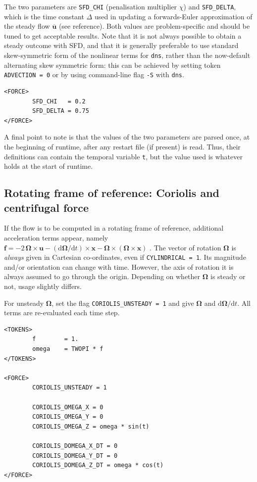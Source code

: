 \documentclass[11pt]{report}
\newcommand\cd{\mathrm{d}} \newcommand\cD{\mathrm{D}}
\begin{document}
The two parameters are \verb|SFD_CHI| (\ie penalisation multiplier
$\chi$) and \verb|SFD_DELTA|, which is the time constant $\Delta$ used
in updating a forwards-Euler approximation of the steady flow
$\overline{\bm{u}}$ (see reference).  Both values are problem-specific
and should be tuned to get acceptable results.  Note that it is not
always possible to obtain a steady outcome with SFD, and that it is
generally preferable to use standard skew-symmetric form of the
nonlinear terms for \verb|dns|, rather than the now-default
alternating skew symmetric form: this can be achieved by setting token
\verb|ADVECTION = 0| or by using command-line flag \verb|-S| with
\verb|dns|.

\begin{verbatim}
<FORCE>
        SFD_CHI   = 0.2
        SFD_DELTA = 0.75
</FORCE>
\end{verbatim}

A final point to note is that the values of the two parameters are
parsed once, at the beginning of runtime, after any restart file (if
present) is read.  Thus, their definitions can contain the temporal
variable \verb|t|, but the value used is whatever holds at the start
of runtime.

\subsection{Rotating frame of reference: Coriolis and centrifugal force}
\label{sec.rotating}


If the flow is to be computed in a rotating frame of reference,
additional acceleration terms appear, namely $\bm{f} = -2\,\bm{\Omega}
\times \bm{u} - (\cd\bm{\Omega}/\cd t) \times \bm{x} -\bm{\Omega}
\times (\bm{\Omega} \times \bm{x})$ \citep{bat67}. The vector
of rotation $\bm{\Omega}$ is \emph{always} given in Cartesian
co-ordinates, even if \verb|CYLINDRICAL = 1|. Its magnitude and/or
orientation can change with time. However, the axis of rotation it is
always assumed to go through the origin. Depending on whether
$\bm{\Omega}$ is steady or not, usage slightly differs.


For unsteady $\bm{\Omega}$, set the flag \verb|CORIOLIS_UNSTEADY = 1|
and give $\bm{\Omega}$ and $\cd\bm{\Omega}/\cd t$. All terms are
re-evaluated each time step.
\begin{verbatim}
<TOKENS>
        f        = 1.
        omega    = TWOPI * f
</TOKENS>

<FORCE>
        CORIOLIS_UNSTEADY = 1

        CORIOLIS_OMEGA_X = 0
        CORIOLIS_OMEGA_Y = 0
        CORIOLIS_OMEGA_Z = omega * sin(t)

        CORIOLIS_DOMEGA_X_DT = 0
        CORIOLIS_DOMEGA_Y_DT = 0
        CORIOLIS_DOMEGA_Z_DT = omega * cos(t)
</FORCE>
\end{verbatim}
\end{document}
